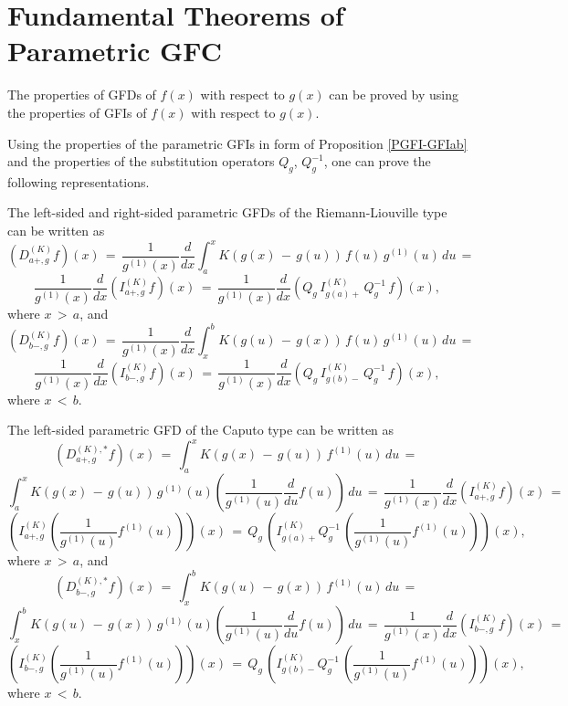 \documentclass[12pt]{article}
\begin{document}


\section{Fundamental Theorems of Parametric GFC}


The properties of GFDs of $f(x)$ with respect to $g(x)$
can be proved by using the properties of GFIs of $f(x)$ with respect to $g(x)$.

Using the properties of the parametric GFIs in form of Proposition \ref{PGFI-GFIab} and the properties of the substitution operators $Q_g$, $Q^{-1}_g$, one can prove the following representations.

The left-sided and right-sided parametric GFDs of the Riemann-Liouville type can be written as
\[
(D^{(K)}_{a+,g} f)(x) \, = \, 
\frac{1}{g^{(1)}(x)} \frac{d}{dx} \int^x_a K(g(x) \, - \, g(u)) \, f(u) \, g^{(1)}(u) \, du 
\, = \, 
\]
\begin{equation}
\frac{1}{g^{(1)}(x)} \frac{d}{dx} (I^{(K)}_{a+,g} f)(x) \, = \, 
\frac{1}{g^{(1)}(x)} \frac{d}{dx} (Q_g \, I^{(K)}_{g(a)+} \, Q^{-1}_g\, f)(x) ,
\end{equation}
where $x \, > \, a$, and
\[
(D^{(K)}_{b-,g} f)(x) \, = \, 
\frac{1}{g^{(1)}(x)} \frac{d}{dx} \int^b_x K(g(u) \, - \, g(x)) \, f(u) \, g^{(1)}(u) \, du \, = \, 
\]
\begin{equation}
\frac{1}{g^{(1)}(x)} \frac{d}{dx} (I^{(K)}_{b-,g} f)(x) \, = \, 
\frac{1}{g^{(1)}(x)} \frac{d}{dx} (Q_g \, I^{(K)}_{g(b)-} \, Q^{-1}_g\, f)(x) ,
\end{equation}
where $x \, < \, b$.

The left-sided parametric GFD of the Caputo type can be written as
\[
(D^{(K),*}_{a+,g} f)(x) \, = \, 
\int^x_a K(g(x) \, - \, g(u)) \, f^{(1)}(u) \, du \, = \,
\]
\[
\int^x_a K(g(x) \, - \, g(u)) \, g^{(1)}(u) \left( \frac{1}{g^{(1)}(u)} \frac{d}{du} f(u) \right) \, du 
\, = \, \frac{1}{g^{(1)}(x)} \frac{d}{dx} (I^{(K)}_{a+,g} f)(x) \, = \, 
\]
\begin{equation}
\left( I^{(K)}_{a+,g} \left( \frac{1}{g^{(1)}(u)} f^{(1)}(u) \right)\right)(x) \, = \, 
Q_{g} \, \left( I^{(K)}_{g(a)+} Q^{-1}_g \, \left( \frac{1}{g^{(1)}(u)} f^{(1)}(u) \right) \right)(x) ,
\end{equation}
where $x \, > \, a$, and
\[
(D^{(K),*}_{b-,g} f)(x) \, = \, 
\int^b_x K(g(u) \, - \, g(x)) \, f^{(1)}(u) \, du \, = \,
\]
\[
\int^b_x K(g(u) \, - \, g(x)) \, g^{(1)}(u) \left( \frac{1}{g^{(1)}(u)} \frac{d}{du} f(u) \right) \, du 
\, = \, \frac{1}{g^{(1)}(x)} \frac{d}{dx} (I^{(K)}_{b-,g} f)(x) \, = \, 
\]
\begin{equation}
\left( I^{(K)}_{b-,g} \left( \frac{1}{g^{(1)}(u)} f^{(1)}(u) \right)\right)(x) \, = \, 
Q_{g} \, \left( I^{(K)}_{g(b)-} Q^{-1}_g \, 
\left( \frac{1}{g^{(1)}(u)} f^{(1)}(u) \right) \right)(x) ,
\end{equation}
where $x \, < \, b$.
\end{document}
